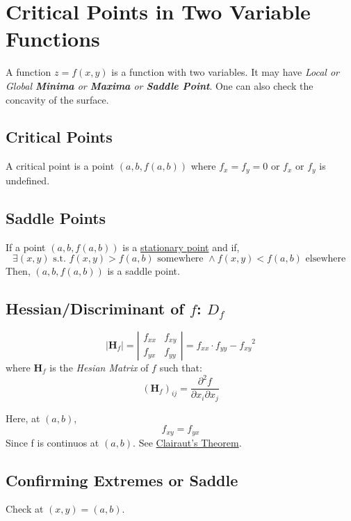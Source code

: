 \chapter{Critical Points in Two Variable Functions}
\label{chap:critical-points-in-two-variable-functions}

A function \(z=f(x,y)\) is a function with two variables. It may have
\emph{Local or Global \textbf{Minima} or \textbf{Maxima} or
\textbf{Saddle Point}}.
One can also check the concavity of the surface.

\section{Critical Points}
\label{sec:critical-points}
A critical point is a point \((a,b,f(a,b))\) where \(f_x=f_y=0\) or \(f_x\) or \(f_y\) is
undefined.

\section{Saddle Points}
\label{sec:saddle-points}
If a point \((a,b,f(a,b))\) is a \href{sec:critical-points}{stationary point}
and if,
\[\exists (x,y) \text{ s.t. } f(x,y)>f(a,b) \text{ somewhere } \land
f(x,y)<f(a,b) \text{ elsewhere }\]
Then, \((a,b,f(a,b))\) is a saddle point.

\section{Hessian/Discriminant of \(f\): \(D_f\)}
\label{sec:hessian-discriminant-of-f-d_f}
\[
  \mid \textbf{H}_f \mid  = 
  \left|
  \begin{matrix}
    f_{xx} & f_{xy} \\
    f_{yx} & f_{yy}
  \end{matrix}
  \right| = f_{xx}\cdot f_{yy} - {f_{xy}}^2
\]
where \(\textbf{H}_f\) is the \emph{Hesian Matrix} of \(f\) such that:
\[ (\textbf{H}_f)_{ij} = \frac{\partial^2 f}{\partial x_{i}\partial x_{j}}  \] 

Here, at \((a,b)\),
\[ f_{xy}=f_{yx} \] 
Since f is continuos at
\((a,b)\). See \href{def:second-order-partial-derivative}{Clairaut's Theorem}.

\section{Confirming Extremes or Saddle}
\label{sec:confirming-extremes-or-saddle}
Check at \((x,y)=(a,b)\).

